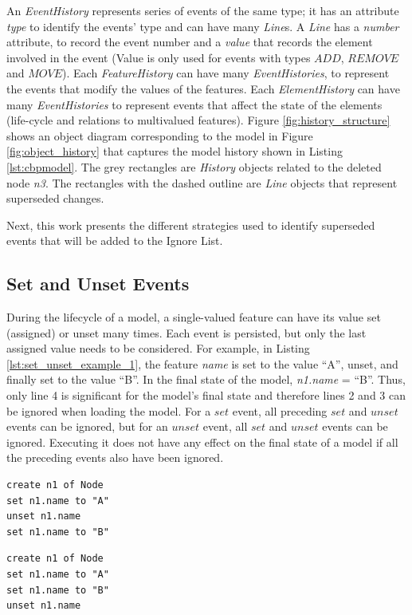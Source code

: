 An \emph{EventHistory} represents series of events of the same type; it has an attribute \emph{type} to identify the events' type and can have many \emph{Line}s. A \emph{Line} has a \emph{number} attribute, to record the event number and a \emph{value} that records the element involved in the event (Value is only used for events with types \emph{$ADD$}, \emph{$REMOVE$} and \emph{$MOVE$}). Each \emph{FeatureHistory} can have many \emph{EventHistories}, to represent the events that modify the values of the features. Each \emph{ElementHistory} can have many \emph{EventHistories} to represent events that affect the state of the elements (life-cycle and relations to multivalued features). Figure \ref{fig:history_structure} shows an object diagram corresponding to the model in Figure \ref{fig:object_history} that captures the model history shown in Listing \ref{lst:cbpmodel}. The grey rectangles are \emph{History} objects related to the deleted node \emph{n3}. The rectangles with the dashed outline are \emph{Line} objects that represent superseded changes. 

Next, this work presents the different strategies used to identify superseded events that will be added to the Ignore List.   

\subsection{Set and Unset Events}
\label{subsec:set_and_unset_operations}
During the lifecycle of a model, a single-valued feature can have its value set (assigned) or unset many times. Each event is persisted, but only the last assigned value needs to be considered. For example, in Listing \ref{lst:set_unset_example_1}, the feature \emph{name} is set to the value ``A'', unset, and finally set to the value ``B''.  In the final state of the model, \emph{n1.name} = ``B''. Thus, only line 4 is significant for the model's final state and therefore lines 2 and 3 can be ignored when loading the model. For a $set$ event, all preceding $set$ and $unset$ events can be ignored, but for an $unset$ event, all $set$ and $unset$ events can be ignored. Executing it does not have any effect on the final state of a model if all the preceding events also have been ignored.

\vspace{-20pt}
\begin{minipage}[t]{0.49\linewidth}
\begin{lstlisting}[style=eol,caption={A CBP representation of attribute \emph{name} assignments ended with SET.},label=lst:set_unset_example_1]
create n1 of Node
set n1.name to "A"
unset n1.name
set n1.name to "B"
\end{lstlisting}
\end{minipage}
\hfill
\begin{minipage}[t]{0.49\linewidth}
\begin{lstlisting}[style=eol,caption={A CBP representation of attribute \emph{name} assignments ended with UNSET.},label=lst:set_unset_example_2]
create n1 of Node
set n1.name to "A"
set n1.name to "B"
unset n1.name
\end{lstlisting}
\end{minipage}

